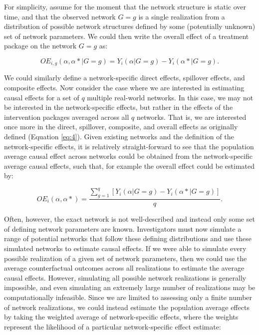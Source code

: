 \documentclass{article}
\theoremstyle{definition}
\begin{document}
For simplicity, assume for the moment that the network structure is static over time, and that the observed network $G =g$ is a single realization from a distribution of possible network structures defined by some (potentially unknown) set of network parameters. We could then write the overall effect of a treatment package on the network $G=g$ as:

\begin{equation}\label{eq:5}
   OE_{i,g}\left(\alpha,\alpha* |G=g \right) = Y_{i}\left(\alpha|G=g\right) - Y_{i}\left(\alpha*|G=g\right).	
\end{equation}

We could similarly define a network-specific direct effects, spillover effects, and composite effects.
Now consider the case where we are interested in estimating causal effects for a set of $q$ multiple real-world networks. In this case, we may not be interested in the network-specific effects, but rather in the effects of the intervention packages averaged across all $q$ networks. That is, we are interested once more in the direct, spillover, composite, and overall effects as originally defined \cite{hudgens_toward_2008} (Equation \ref{eq:4}). Given existing networks and the definition of the network-specific effects, it is relatively straight-forward to see that the population average causal effect across networks could be obtained from the network-specific average causal effects, such that, for example the overall effect could be estimated by:

\begin{equation}\label{eq:6}
   OE_{i}\left(\alpha,\alpha* \right) = \frac{\sum_{g=1}^q\left[Y_{i}\left(\alpha|G=g\right) - Y_{i}\left(\alpha*|G=g\right)\right]}{q}.	
\end{equation}


Often, however, the exact network is not well-described and instead only some set of defining network parameters are known. Investigators must now simulate a range of potential networks that follow these defining distributions and use these simulated networks to estimate causal effects. If we were able to simulate every possible realization of a given set of network parameters, then we could use the average counterfactual outcomes across all realizations to estimate the average causal effects. However, simulating all possible network realizations is generally impossible, and even simulating an extremely large number of realizations may be computationally infeasible. Since we are limited to assessing only a finite number of network realizations, we could instead estimate the population average effects by taking the weighted average of network-specific effects, where the weights represent the likelihood of a particular network-specific effect estimate:
\end{document}
